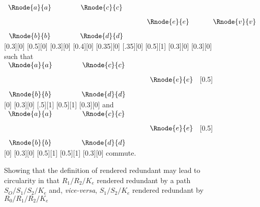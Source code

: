 \begin{figure} [h]  %
\begin{center}
$
\begin{array}{c p{0.75cm}c p{0.5cm}c p{0.5cm}c}
 \Rnode{a}{a}  && \Rnode{c}{c}  &&              &&              \\ [0.3cm]
	 	           &&               && \Rnode{e}{e} && \Rnode{v}{v} \\ [0.3cm]     
 \Rnode{b}{b}  && \Rnode{d}{d}  &&              &&              \\ 
\end{array}
$
[0.3][0]
\idcomp
{} 
[0.5][0]
[0.3][0]
\idcomp
{}
[0.4][0]
\idcomp
{}
[0.35][0]
[.35][0]
[0.5][1]
[0.3][0]
\idcomp
{}
[0.3][0]
\idcomp
\vspace{1.5cm}
\newline
such that \hspace{0.5cm}
$
\begin{array}{c p{0.75cm}c p{0.5cm}c}
 \Rnode{a}{a}  && \Rnode{c}{c}  &&              \\ [0.3cm]
	 	           &&               && \Rnode{e}{e}  \\ [0.3cm]     
 \Rnode{b}{b}  && \Rnode{d}{d}  &&              \\ 
\end{array}
$
[0.5][0]
[0.3][0]
\idcomp
{}
[.5][1]
[0.5][1]
[0.3][0]
\idcomp
\hspace {0.25cm} and \hspace{0.5cm}
$
\begin{array}{c p{0.75cm}c p{0.5cm}c}
 \Rnode{a}{a}  && \Rnode{c}{c}  &&              \\ [0.3cm]
	 	           &&               && \Rnode{e}{e}  \\ [0.3cm]     
 \Rnode{b}{b}  && \Rnode{d}{d}  &&               \\ 
\end{array}
$
[0.5][0]
[0.3][0]
\idcomp
{}
[0.5][1]
[0.5][1]
[0.3][0]
\idcomp
\hspace{0.2cm} commute.

\end{center}
\caption{Showing that the definition of rendered redundant may lead to circularity in that
$R_1/R_2/K_e$  rendered redundant by a path $S_O/S_1/S_2/K_e$  and, \textit{vice-versa}, 
$S_1/S_2/K_e$ rendered redundant by $R_0/R_1/R_2/K_e$}
\label{redundancyproblemshape}
\end{figure}